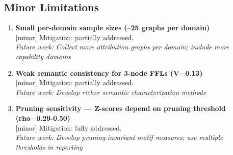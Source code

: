 \documentclass[11pt,a4paper]{article}
\begin{document}
\subsection{Minor Limitations}
\begin{enumerate}[leftmargin=*]
\item \textbf{Small per-domain sample sizes (\textasciitilde{}25 graphs per domain)} \\\textcolor{minorgreen}{[minor]} Mitigation: partially addressed. \\\textit{Future work: Collect more attribution graphs per domain; include more capability domains}
\item \textbf{Weak semantic consistency for 3-node FFLs (V=0.13)} \\\textcolor{minorgreen}{[minor]} Mitigation: partially addressed. \\\textit{Future work: Develop richer semantic characterization methods}
\item \textbf{Pruning sensitivity — Z-scores depend on pruning threshold (rho=0.29-0.50)} \\\textcolor{minorgreen}{[minor]} Mitigation: fully addressed. \\\textit{Future work: Develop pruning-invariant motif measures; use multiple thresholds in reporting}
\end{enumerate}
\end{document}
